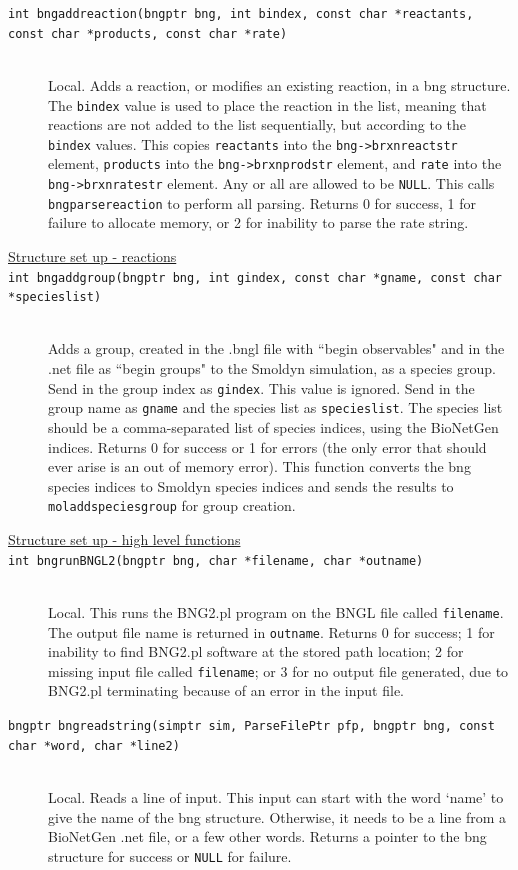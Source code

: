 \documentclass {scrbook}
\newcommand {\ttt} {\texttt}
\begin{document}
\begin{description}
\item[\ttt{int bngaddreaction(bngptr bng, int bindex, const char *reactants, const char *products, const char *rate)}]
\hfill \\
Local. Adds a reaction, or modifies an existing reaction, in a bng structure. The \ttt{bindex} value is used to place the reaction in the list, meaning that reactions are not added to the list sequentially, but according to the \ttt{bindex} values. This copies \ttt{reactants} into the \ttt{bng->brxnreactstr} element, \ttt{products} into the \ttt{bng->brxnprodstr} element, and \ttt{rate} into the \ttt{bng->brxnratestr} element. Any or all are allowed to be \ttt{NULL}. This calls \ttt{bngparsereaction} to perform all parsing. Returns 0 for success, 1 for failure to allocate memory, or 2 for inability to parse the rate string.

\item[\underline{Structure set up - reactions}]

\item[\ttt{int bngaddgroup(bngptr bng, int gindex, const char *gname, const char *specieslist)}]
\hfill \\
Adds a group, created in the .bngl file with ``begin observables" and in the .net file as ``begin groups" to the Smoldyn simulation, as a species group. Send in the group index as \ttt{gindex}. This value is ignored. Send in the group name as \ttt{gname} and the species list as \ttt{specieslist}. The species list should be a comma-separated list of species indices, using the BioNetGen indices. Returns 0 for success or 1 for errors (the only error that should ever arise is an out of memory error). This function converts the bng species indices to Smoldyn species indices and sends the results to \ttt{moladdspeciesgroup} for group creation.

\item[\underline{Structure set up - high level functions}]

\item[\ttt{int bngrunBNGL2(bngptr bng, char *filename, char *outname)}]
\hfill \\
Local. This runs the BNG2.pl program on the BNGL file called \ttt{filename}. The output file name is returned in \ttt{outname}. Returns 0 for success; 1 for inability to find BNG2.pl software at the stored path location; 2 for missing input file called \ttt{filename}; or 3 for no output file generated, due to BNG2.pl terminating because of an error in the input file.

\item[\ttt{bngptr bngreadstring(simptr sim, ParseFilePtr pfp, bngptr bng, const char *word, char *line2)}]
\hfill \\
Local. Reads a line of input. This input can start with the word `name' to give the name of the bng structure. Otherwise, it needs to be a line from a BioNetGen .net file, or a few other words. Returns a pointer to the bng structure for success or \ttt{NULL} for failure.


\end{description}
\end{document}
